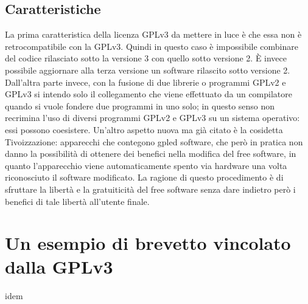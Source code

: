\subsection{Caratteristiche}
La prima caratteristica della licenza GPLv3 da mettere in luce è che essa non è retrocompatibile con la GPLv3. Quindi in questo caso è impossibile combinare del codice rilasciato sotto la versione 3 con quello sotto versione 2. \`E invece possibile aggiornare alla terza versione un software rilascito sotto versione 2. Dall'altra parte invece, con la fusione di due librerie o programmi GPLv2 e GPLv3 si intendo solo il collegamento che viene effettuato da un compilatore quando si vuole fondere due programmi in uno solo; in questo senso non recrimina l'uso di diversi programmi GPLv2 e GPLv3 su un sistema operativo: essi possono coesistere.
Un'altro aspetto nuova ma già citato è la cosidetta Tivoizzazione: apparecchi che contegono gpled software, che però in pratica non danno la possibilità di ottenere dei benefici nella modifica del free software, in quanto l'apparecchio viene automaticamente spento via hardware una volta riconosciuto il software modificato. La ragione di questo procedimento è di sfruttare la libertà e la gratuiticità del free software senza dare indietro però i benefici di tale libertà all'utente finale.











\section{Un esempio di brevetto vincolato dalla GPLv3}
idem
\usepackage{graphicx}

